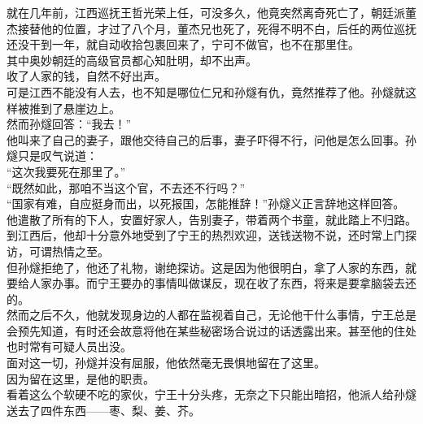 \begin{multicols}{\theparacolNo}
就在几年前，江西巡抚王哲光荣上任，可没多久，他竟突然离奇死亡了，朝廷派董杰接替他的位置，才过了八个月，董杰兄也死了，死得不明不白，后任的两位巡抚还没干到一年，就自动收拾包裹回来了，宁可不做官，也不在那里住。\\

其中奥妙朝廷的高级官员都心知肚明，却不出声。\\

收了人家的钱，自然不好出声。\\

可是江西不能没有人去，也不知是哪位仁兄和孙燧有仇，竟然推荐了他。孙燧就这样被推到了悬崖边上。\\

然而孙燧回答：“我去！”\\

他叫来了自己的妻子，跟他交待自己的后事，妻子吓得不行，问他是怎么回事。孙燧只是叹气说道：\\

“这次我要死在那里了。”\\

“既然如此，那咱不当这个官，不去还不行吗？”\\

“国家有难，自应挺身而出，以死报国，怎能推辞！”孙燧义正言辞地这样回答。\\

他遣散了所有的下人，安置好家人，告别妻子，带着两个书童，就此踏上不归路。\\

到江西后，他却十分意外地受到了宁王的热烈欢迎，送钱送物不说，还时常上门探访，可谓热情之至。\\

但孙燧拒绝了，他还了礼物，谢绝探访。这是因为他很明白，拿了人家的东西，就要给人家办事。而宁王要办的事情叫做谋反，现在收了东西，将来是要拿脑袋去还的。\\

然而之后不久，他就发现身边的人都在监视着自己，无论他干什么事情，宁王总是会预先知道，有时还会故意将他在某些秘密场合说过的话透露出来。甚至他的住处也时常有可疑人员出没。\\

面对这一切，孙燧并没有屈服，他依然毫无畏惧地留在了这里。\\

因为留在这里，是他的职责。\\

看着这么个软硬不吃的家伙，宁王十分头疼，无奈之下只能出暗招，他派人给孙燧送去了四件东西——枣、梨、姜、芥。\\


\end{multicols}
